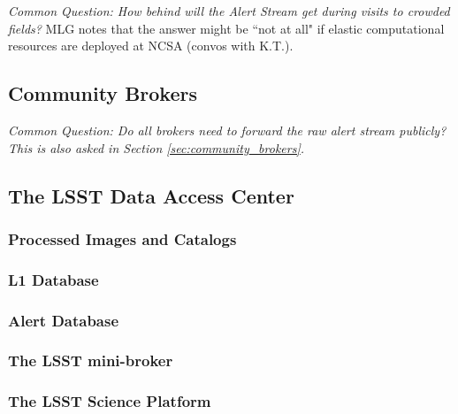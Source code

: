 {\it Common Question: How behind will the Alert Stream get during visits to crowded fields?} MLG notes that the answer might be ``not at all" if elastic computational resources are deployed at NCSA (convos with K.T.).


\subsection{Community Brokers}

{\it Common Question: Do all brokers need to forward the raw alert stream publicly? This is also asked in Section \ref{sec:community_brokers}.}


\subsection{The LSST Data Access Center}

\subsubsection{Processed Images and Catalogs}

\subsubsection{L1 Database}

\subsubsection{Alert Database}

\subsubsection{The LSST mini-broker}

\subsubsection{The LSST Science Platform}
